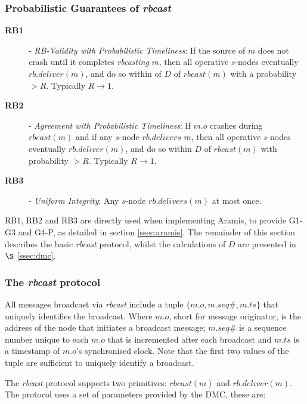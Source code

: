     \subsubsection*{Probabilistic Guarantees of \emph{rbcast}}
    
    \begin{description}
		    \item [\textbf{RB1}] - \emph{RB-Validity with Probabilistic Timeliness}: If the source of $m$ does not crash until it completes \emph{rbcasting} $m$, then all operative $s$-nodes eventually $rb.deliver(m)$, and do so within of $D$ of  $rbcast(m)$ with a probability $> R$.  Typically $R \rightarrow 1$.
		    
		    \item [\textbf{RB2}] - \emph{Agreement with Probabilistic Timeliness}: If $m.o$ crashes during $rbcast(m)$ and if any $s$-node $rb.delivers$ $m$, then all operative $s$-nodes eventually $rb.deliver(m)$, and do so within $D$ of $rbcast(m)$ with probability $> R$. Typically $R \rightarrow 1$.
		
		    \item [\textbf{RB3}] - \emph{Uniform Integrity}: Any $s$-node $rb.delivers(m)$ at most once.  
    \end{description}
    
    RB1, RB2 and RB3 are directly used when implementing \textsf{Aramis}, to provide G1-G3 and G4-P, as detailed in section \ref{ssec:aramis}.  The remainder of this section describes the basic \emph{rbcast} protocol, whilst the calculations of $D$ are presented in $\S$ \ref{ssec:dmc}.
    
    \subsubsection*{The \emph{rbcast} protocol}
    All messages broadcast via \emph{rbcast} include a tuple $\{m.o, m.seq\#, m.ts\}$ that uniquely identifies the broadcast.  Where $m.o$, short for message originator, is the address of the node that initiates a broadcast message; $m.seq\#$ is a sequence number unique to each $m.o$ that is incremented after each broadcast and $m.ts$ is a timestamp of $m.o$'s synchronised clock.  Note that the first two values of the tuple are sufficient to uniquely identify a broadcast.
    
    The \emph{rbcast} protocol supports two primitives: $rbcast(m)$ and $rb.deliver(m)$.  The protocol uses a set of parameters provided by the DMC, these are:
    
